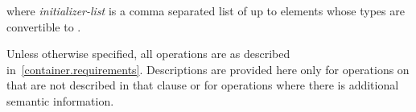 \documentclass[american,twoside]{book}
\begin{document}
where \textit{initializer-list} is a comma separated list of up
to  elements whose types are convertible to .

\pnum
{}%
Unless otherwise specified, all  operations are as described
in~\ref{container.requirements}. Descriptions are provided here
only for operations on  that are not described in that clause
or for operations where there is additional semantic information.

%
%
%
%
%
%
%
%
%
\end{document}
